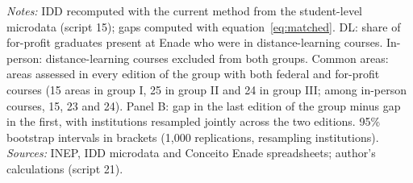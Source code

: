 \documentclass[11pt,a4paper]{article}
\begin{document}
\begin{table}[!htbp]
\centering\small
\caption{Federal minus private for-profit value-added gap by edition: all courses, in-person courses only and areas common to every edition of each group}\label{tab:inperson}
\resizebox{\linewidth}{!}{}
\begin{minipage}{\linewidth}\vspace{0.4em}\scriptsize
\textit{Notes:} IDD recomputed with the current method from the student-level microdata (script 15); gaps computed with equation~\eqref{eq:matched}. DL: share of for-profit graduates present at Enade who were in distance-learning courses. In-person: distance-learning courses excluded from both groups. Common areas: areas assessed in every edition of the group with both federal and for-profit courses (15 areas in group I, 25 in group II and 24 in group III; among in-person courses, 15, 23 and 24). Panel B: gap in the last edition of the group minus gap in the first, with institutions resampled jointly across the two editions. 95\% bootstrap intervals in brackets (1,000 replications, resampling institutions). \textit{Sources:} INEP, IDD microdata and Conceito Enade spreadsheets; author's calculations (script 21).
\end{minipage}
\end{table}
\end{document}
